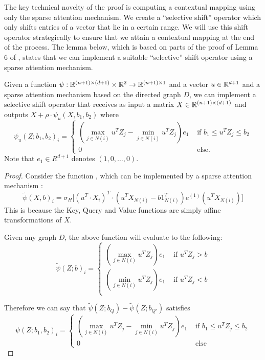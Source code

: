 The key technical novelty of the proof is computing a contextual mapping using only the 
sparse attention mechanism.  We create a 
``selective shift'' operator which only shifts entries of a vector that 
lie in  a certain range.  We will use this shift operator strategically to ensure that 
we attain a contextual mapping at the end of the process. 
The lemma below, which is based on parts of the proof of Lemma 6 of \cite{Yun19}, 
states that we can implement a suitable ``selective'' shift operator using a 
sparse attention mechanism. 
\begin{lemma}
    Given a function $\psi : \mathbb{R}^{(n+1)\times (d+1)} \times \mathbb{R}^2 \to \mathbb{R}^{(n+1) \times 1}$ and a vector $u \in \mathbb{R}^{d+1}$ and a sparse attention mechanism
    based on the directed graph $D$, we can implement a selective shift operator that receives as input
    a matrix $X \in \mathbb{R}^{(n+1) \times (d+1) }$  and outputs $X +  \rho \cdot \psi_u(X,b_1,b_2)$ where
     \[ 
    \psi_u(Z; b_1, b_2)_{i} =   \begin{cases}
        (\max_{j \in N(i)} u^T Z_{j} - \min_{j \in N(i)} u^T Z_{j})e_1  & \text{ if } b_1\leq  u^T Z_{j} \leq b_2\\
        0 & \text{ else. } 
    \end{cases}
    \]
    Note that $e_1 \in R^{d+1}$ denotes $(1,0,\dots,0)$. 
\end{lemma}
\begin{proof}
    Consider the function , which can be implemented by a sparse attention mechanism :
    \[ \tilde{\psi}(X,b)_i = \sigma_H \Big[ (u^T \cdot X_i)^T \cdot (u^T X_{N(i)} - b1_{N(i)}^T) e^{(1)} (u^T X_{N(i)})   \Big] \] 
    This is because the Key, Query and Value functions are simply affine transformations of $X$. 
    
    Given any graph $D$, the above function will evaluate to the following:
    \[ 
   \tilde{\psi}(Z; b)_{i} =  \begin{cases}
        (\max_{j \in N(i)} u^T Z_{j}) e_1 & \text{ if } u^T Z_{j} > b\\
        (\min_{j \in N(i)} u^T Z_{j}) e_1 & \text{ if } u^T Z_{j} < b \\
    \end{cases}
    \] 
    
    Therefore we can say that $\tilde{\psi}(Z; b_{Q}) - \tilde{\psi}(Z; b_{Q'})$ satisfies 
    \[ 
    \psi(Z; b_1, b_2)_{i} =   \begin{cases}
        (\max_{j \in N(i)} u^T Z_{j} - \min_{j \in N(i)} u^T Z_{j}) e_1  & \text{ if } b_1\leq  u^T Z_{j} \leq b_2\\
        0 & \text{ else } 
    \end{cases}
    \] 
\end{proof}

